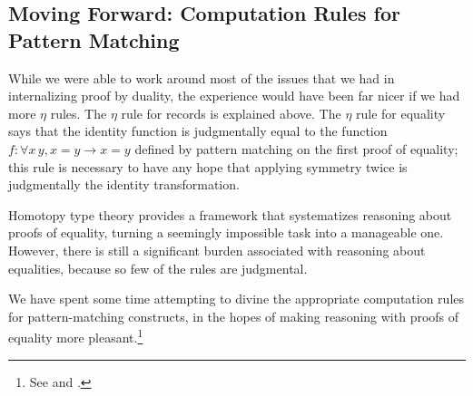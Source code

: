   \subsection{Moving Forward: Computation Rules for Pattern Matching} \label{sec:compute-match}
    While we were able to work around most of the issues that we had in internalizing proof by duality, the experience would have been far nicer if we had more $\eta$ rules.
    The $\eta$ rule for records is explained above.
    The $\eta$ rule for equality says that the identity function is judgmentally equal to the function $f : \forall x\, y, x = y \to x = y$ defined by pattern matching on the first proof of equality; this rule is necessary to have any hope that applying symmetry twice is judgmentally the identity transformation.

    Homotopy type theory provides a framework that systematizes reasoning about proofs of equality, turning a seemingly impossible task into a manageable one.
    However, there is still a significant burden associated with reasoning about equalities, because so few of the rules are judgmental.

    We have spent some time attempting to divine the appropriate computation rules for pattern-matching constructs, in the hopes of making reasoning with proofs of equality more pleasant.\footnote{See  and .}


